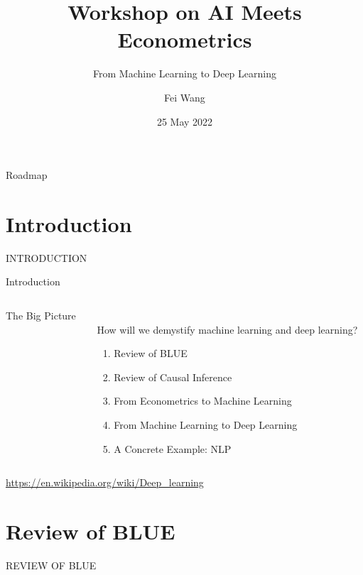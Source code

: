 \documentclass[aspectratio=169, t]{beamer}
\title[Workshop on AI Meets Econometrics]{Workshop on AI Meets Econometrics}
\subtitle{From Machine Learning to Deep Learning}
\author{Fei Wang}
\institute[Goethe University Frankfurt]{Management and Microeconomics \\
 Goethe Universität Frankfurt}
\date{25 May 2022}
\begin{document}
\frame[noframenumbering]{\titlepage}

\begin{frame}{Roadmap}
    \tableofcontents
\end{frame}

\section{Introduction}


\begin{frame}{}
    \vspace{90pt}
    \begin{center}
        \huge INTRODUCTION 
    \end{center}
\end{frame}

\begin{frame}{Introduction}
    \begin{columns}
        \begin{column}{0.45\textwidth}
            The Big Picture
        \end{column}
        \begin{column}{0.45\textwidth}
            \vspace{5mm} \\ 
            How will we demystify machine learning and deep learning?
            \begin{enumerate}
                \item Review of BLUE 
                \item Review of Causal Inference
                \item From Econometrics to Machine Learning
                \item From Machine Learning to Deep Learning
                \item A Concrete Example: NLP
            \end{enumerate}
        \end{column}
    \end{columns}
    \footnotesize{
            \url{https://en.wikipedia.org/wiki/Deep_learning}
            }
\end{frame}


\section{Review of BLUE}


\begin{frame}{}
    \vspace{90pt}
    \begin{center}
        \huge REVIEW OF BLUE
    \end{center}
\end{frame}
\end{document}
